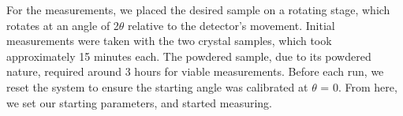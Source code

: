 \documentclass[a4paper,12pt,english]{all-in-one} %
\begin{document}
\begin{multicols}{2}
{For the measurements, we placed the desired sample on a rotating stage, which rotates at an angle of 2$\theta$ relative to the detector’s movement. Initial measurements were taken with the two crystal samples, which took approximately 15 minutes each. The powdered sample, due to its powdered nature, required around 3 hours for viable measurements. Before each run, we reset the system to ensure the starting angle was calibrated at $\theta$ = 0. From here, we set our starting parameters, and started measuring. 
}





\end{multicols}
\end{document}
